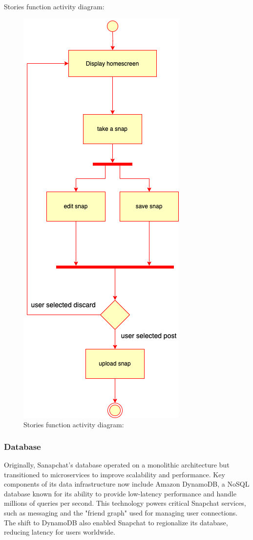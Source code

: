 \documentclass{article}
\begin{document}
\newpage
Stories function activity diagram:
\begin{figure}[H]
    \centering
    \includegraphics[width=0.50\linewidth]{stories.drawio.png}
    \caption{Stories function activity diagram:}
    \label{fig:activity diagram}
\end{figure}

\newpage
\subsubsection{Database}
Originally, Sanapchat's database operated on a monolithic architecture but transitioned to microservices to improve scalability and performance. Key components of its data infrastructure now include Amazon DynamoDB, a NoSQL database known for its ability to provide low-latency performance and handle millions of queries per second. This technology powers critical Snapchat services, such as messaging and the "friend graph" used for managing user connections. The shift to DynamoDB also enabled Snapchat to regionalize its database, reducing latency for users worldwide. \newline
\end{document}
